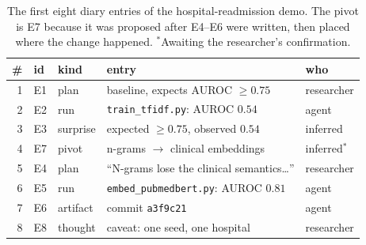 \documentclass[10pt,twocolumn]{article}
\begin{document}
\begin{table}[H]
\centering\scriptsize
\setlength{\tabcolsep}{3pt}
\begin{tabular}{@{}r l l l l@{}}
\hline
\# & id & kind & entry & who \\
\hline
1 & E1 & plan     & baseline, expects AUROC $\ge 0.75$ & researcher \\
2 & E2 & run      & \texttt{train\_tfidf.py}: AUROC $0.54$ & agent \\
3 & E3 & surprise & expected $\ge 0.75$, observed $0.54$ & inferred \\
4 & E7 & pivot    & n-grams $\to$ clinical embeddings & inferred$^\ast$ \\
5 & E4 & plan     & ``N-grams lose the clinical semantics\ldots'' & researcher \\
6 & E5 & run      & \texttt{embed\_pubmedbert.py}: AUROC $0.81$ & agent \\
7 & E6 & artifact & commit \texttt{a3f9c21} & agent \\
8 & E8 & thought  & caveat: one seed, one hospital & researcher \\
\hline
\end{tabular}
\caption{\small The first eight diary entries of the hospital-readmission demo. The pivot is E7 because it was
proposed after E4--E6 were written, then placed where the change happened. $^\ast$Awaiting the researcher's confirmation.}
\label{tab:demo}
\end{table}
\end{document}
